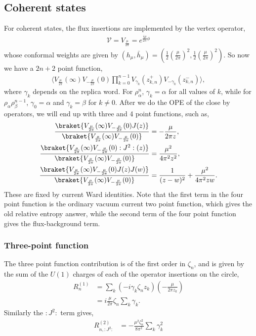 \documentclass[11pt]{article}
\newcommand{\lb}{\left(}
\newcommand{\rb}{\right)}
\begin{document}
\subsection{Coherent states}
For coherent states, the flux insertions are implemented by the vertex operator,
\begin{align}
    \mathcal{V} = V_{\frac{\mu}{2\pi}} = e^{\frac{i\mu}{2\pi}\phi}
\end{align}
whose conformal weights are given by $(h_\mu,\bar h_\mu) = \lb \frac{1}{2}\lb\frac{\mu}{2\pi}\rb^2, \frac{1}{2}\lb\frac{\mu}{2\pi}\rb^2\rb$. So now we have a $2n+2$ point function,
\begin{align}
    \Big\langle V_{\frac{\mu}{2\pi}}(\infty)V_{-\frac{\mu}{2\pi}}(0) \prod_{k=0}^{n-1}V_{\gamma_k}(z_{k,n}^+)V_{-\gamma_k}(z_{k,n}^-)\Big\rangle,
\end{align}
where $\gamma_k$ depends on the replica word. For $\rho_\alpha^n$, $\gamma_k = \alpha$ for all values of $k$, while for $\rho_\alpha\rho_\beta^{n-1}$, $\gamma_0 = \alpha$ and $\gamma_k = \beta$ for $k\neq 0$. After we do the OPE of the close by operators, we will end up with three and 4 point functions, such as,
\begin{align}
    \frac{\braket{V_{\frac{\mu}{2\pi}}(\infty)V_{-\frac{\mu}{2\pi}}(0)J(z)}}{\braket{V_{\frac{\mu}{2\pi}}(\infty)V_{-\frac{\mu}{2\pi}}(0)}} &= -\frac{\mu}{2\pi z},
    \\
    \frac{\braket{V_{\frac{\mu}{2\pi}}(\infty)V_{-\frac{\mu}{2\pi}}(0):J^2:(z)}}{\braket{V_{\frac{\mu}{2\pi}}(\infty)V_{-\frac{\mu}{2\pi}}(0)}} &= \frac{\mu^2}{4\pi^2 z^2},\\
    \frac{\braket{V_{\frac{\mu}{2\pi}}(\infty)V_{-\frac{\mu}{2\pi}}(0)J(z)J(w)}}{\braket{V_{\frac{\mu}{2\pi}}(\infty)V_{-\frac{\mu}{2\pi}}(0)}} &= \frac{1}{(z-w)^2}+\frac{\mu^2}{4\pi^2 zw}.
\end{align}
These are fixed by current Ward identities. 
Note that the first term in the four point function is the ordinary vacuum current two point function, which gives the old relative entropy answer, while the second term of the four point function gives the flux-background term.
\subsubsection{Three-point function}
The three point function contribution is of the first order in $\zeta_n$, and is given by the sum of the $U(1)$ charges of each of the operator insertions on the circle,
\begin{align}
    R_n^{(1)} &= \sum_k (-i \gamma_k \zeta_nz_k )\lb -\frac{\mu}{2\pi z_k}\rb \\
    &= i \frac{\mu}{2\pi}\zeta_n \sum_k\gamma_k.
\end{align}
Similarly the $:J^2:$ term gives,
\begin{align}
    R_{n,:J^2:}^{(2)} &= -\frac{\mu^2\zeta_n^2} {8\pi^2}\sum_k\gamma_k^2
\end{align}
\end{document}
